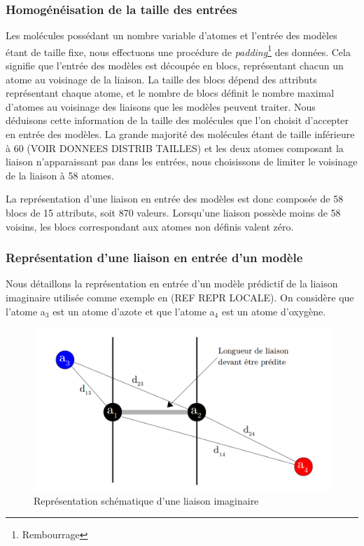 \subsubsection{Homogénéisation de la taille des entrées}
\par Les molécules possédant un nombre variable d'atomes et l'entrée des modèles étant de taille fixe, nous effectuons une procédure de \emph{padding}\footnote{Rembourrage} des données. Cela signifie que l'entrée des modèles est découpée en blocs, représentant chacun un atome au voisinage de la liaison. La taille des blocs dépend des attributs représentant chaque atome, et le nombre de blocs définit le nombre maximal d'atomes au voisinage des liaisons que les modèles peuvent traiter. Nous déduisons cette information de la taille des molécules que l'on choisit d'accepter en entrée des modèles. La grande majorité des molécules étant de taille inférieure à 60 (VOIR DONNEES DISTRIB TAILLES) et les deux atomes composant la liaison n'apparaissant pas dans les entrées, nous choisissons de limiter le voisinage de la liaison à 58 atomes.\\
\par La représentation d'une liaison en entrée des modèles est donc composée de 58 blocs de 15 attributs, soit 870 valeurs. Lorsqu'une liaison possède moins de 58 voisins, les blocs correspondant aux atomes non définis valent zéro.

\subsubsection{Représentation d'une liaison en entrée d'un modèle}

\par Nous détaillons la représentation en entrée d'un modèle prédictif de la liaison imaginaire utilisée comme exemple en (REF REPR LOCALE). On considère que l'atome a$_3$ est un atome d'azote et que l'atome a$_4$ est un atome d'oxygène.

\vspace{0.5cm}

\begin{figure}[!h]
	\centering
	\includegraphics[scale=0.3]{images/classes_pos_4.png}
	\caption{Représentation schématique d'une liaison imaginaire}
\end{figure}

